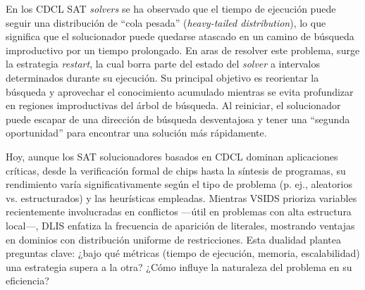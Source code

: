 En los CDCL SAT \textit{solvers} se ha observado que el tiempo de ejecución puede seguir una distribución de ``cola pesada'' (\textit{heavy-tailed distribution}), lo que significa que el solucionador puede quedarse atascado en un camino de búsqueda improductivo por un tiempo prolongado. En aras de resolver este problema, surge la estrategia \textit{restart}, la cual borra parte del estado del \textit{solver} a intervalos determinados durante su ejecución. Su principal objetivo es reorientar la búsqueda y aprovechar el conocimiento acumulado mientras se evita profundizar en regiones improductivas del árbol de búsqueda. Al reiniciar, el solucionador puede escapar de una dirección de búsqueda desventajosa y tener una ``segunda oportunidad'' para encontrar una solución más rápidamente.










Hoy, aunque los SAT solucionadores basados en CDCL dominan aplicaciones críticas, desde la verificación formal de chips hasta la síntesis de programas, su rendimiento varía significativamente según el tipo de problema (p. ej., aleatorios vs. estructurados) y las heurísticas empleadas. Mientras VSIDS prioriza variables recientemente involucradas en conflictos —útil en problemas con alta estructura local—, DLIS enfatiza la frecuencia de aparición de literales, mostrando ventajas en dominios con distribución uniforme de restricciones. Esta dualidad plantea preguntas clave: ¿bajo qué métricas (tiempo de ejecución, memoria, escalabilidad) una estrategia supera a la otra? ¿Cómo influye la naturaleza del problema en su eficiencia?

